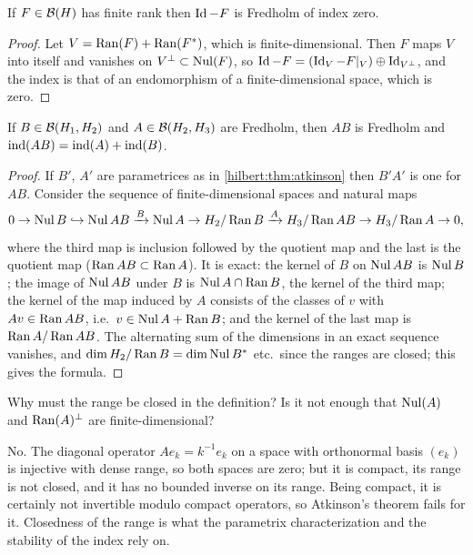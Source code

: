 \begin{lemma}\label{hilbert:lem:finite-rank-index}
If $F\in\mathcal{B}(H)$ has finite rank then $\operatorname{Id}-F$ is Fredholm of index zero.
\end{lemma}
\begin{proof}
Let $V=\operatorname{Ran}(F)+\operatorname{Ran}(F^*)$, which is finite-dimensional. Then $F$ maps $V$ into itself and
vanishes on $V^\perp\subset\operatorname{Nul}(F)$, so $\operatorname{Id}-F=(\operatorname{Id}_V-F|_V)\oplus\operatorname{Id}_{V^\perp}$, and the index is that
of an endomorphism of a finite-dimensional space, which is zero.
\end{proof}

\begin{proposition}\label{hilbert:prop:index-product}
If $B\in\mathcal{B}(H_1,H_2)$ and $A\in\mathcal{B}(H_2,H_3)$ are Fredholm, then $AB$ is Fredholm and
$\operatorname{ind}(AB)=\operatorname{ind}(A)+\operatorname{ind}(B)$.
\end{proposition}
\begin{proof}
If $B'$, $A'$ are parametrices as in \cref{hilbert:thm:atkinson} then $B'A'$ is one for $AB$.
Consider the sequence of finite-dimensional spaces and natural maps
\begin{equation*}
0\to\operatorname{Nul} B\hookrightarrow\operatorname{Nul} AB\xrightarrow{B}\operatorname{Nul} A\to H_2/\operatorname{Ran} B\xrightarrow{A}H_3/\operatorname{Ran} AB\to H_3/\operatorname{Ran} A\to0 ,
\end{equation*}
where the third map is inclusion followed by the quotient map and the last is the
quotient map ($\operatorname{Ran} AB\subset\operatorname{Ran} A$). It is exact: the kernel of $B$ on $\operatorname{Nul} AB$ is $\operatorname{Nul} B$; the
image of $\operatorname{Nul} AB$ under $B$ is $\operatorname{Nul} A\cap\operatorname{Ran} B$, the kernel of the third map; the kernel of
the map induced by $A$ consists of the classes of $v$ with $Av\in\operatorname{Ran} AB$, i.e.\
$v\in\operatorname{Nul} A+\operatorname{Ran} B$; and the kernel of the last map is $\operatorname{Ran} A/\operatorname{Ran} AB$. The alternating sum of the
dimensions in an exact sequence vanishes, and $\dim H_2/\operatorname{Ran} B=\dim\operatorname{Nul} B^*$ etc.\ since the
ranges are closed; this gives the formula.
\end{proof}

\begin{question}
Why must the range be closed in the definition? Is it not enough that
$\operatorname{Nul}(A)$ and $\operatorname{Ran}(A)^\perp$ are finite-dimensional?
\end{question}
\begin{answer}
No. The diagonal operator $Ae_k=k^{-1}e_k$ on a space with orthonormal basis
$(e_k)$ is injective with dense range, so both spaces are zero; but it is
compact, its range is not closed, and it has no bounded inverse on its range.
Being compact, it is certainly not invertible modulo compact operators, so
Atkinson's theorem fails for it. Closedness of the range is what the
parametrix characterization and the stability of the index rely on.
\end{answer}

